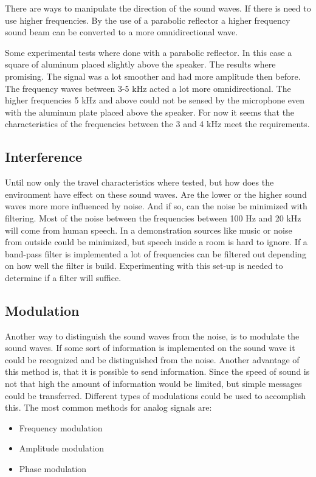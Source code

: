 \documentclass[10pt,a4paper]{article}
\begin{document}
There are ways to manipulate the direction of the sound waves. If there is need to use higher frequencies. By the use of a parabolic reflector a higher frequency sound beam can be converted to a more omnidirectional wave. 

Some experimental tests where done with a parabolic reflector. In this case a square of aluminum placed slightly above the speaker. The results where promising. The signal was a lot smoother and had more amplitude then before. The frequency waves between 3-5 kHz acted a lot more omnidirectional. The higher frequencies 5 kHz and above could not be sensed by the microphone even with the aluminum plate placed above the speaker. For now it seems that the characteristics of the frequencies between the 3 and 4 kHz meet the requirements.


\subsection{Interference}

Until now only the travel characteristics where tested, but how does the environment have effect on these sound waves. Are the lower or the higher sound waves more more influenced by noise. And if so, can the noise be minimized with filtering. Most of the noise between the frequencies between 100 Hz and 20 kHz will come from human speech. In a demonstration sources like music or noise from outside could be minimized, but speech inside a room is hard to ignore. If a band-pass filter is implemented a lot of frequencies can be filtered out depending on how well the filter is build. Experimenting with this set-up is needed to determine if a filter will suffice.

\subsection{Modulation}

Another way to distinguish the sound waves from the noise, is to modulate the sound waves. If some sort of information is implemented on the sound wave it could be recognized and be distinguished from the noise. Another advantage of this method is, that it is possible to send information. Since the speed of sound is not that high the amount of information would be limited, but simple messages could be transferred. Different types of modulations could be used to accomplish this. The most common methods for analog signals are:  

\begin{itemize}
\item Frequency modulation
\item Amplitude modulation
\item Phase modulation
\end{itemize}
\end{document}
